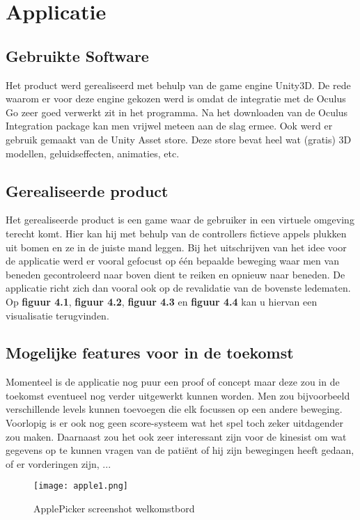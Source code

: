 \chapter{Applicatie}
\label{ch:applicatie}

\section{Gebruikte Software}
Het product werd gerealiseerd met behulp van de game engine Unity3D. De rede waarom er voor deze engine gekozen werd is omdat de integratie met de Oculus Go zeer goed verwerkt zit in het programma. Na het downloaden van de Oculus Integration package kan men vrijwel meteen aan de slag ermee. Ook werd er gebruik gemaakt van de Unity Asset store. Deze store bevat heel wat (gratis) 3D modellen, geluidseffecten, animaties, etc.

\section{Gerealiseerde product}
Het gerealiseerde product is een game waar de gebruiker in een virtuele omgeving terecht komt. Hier kan hij met behulp van de controllers fictieve appels plukken uit bomen en ze in de juiste mand leggen. Bij het uitschrijven van het idee voor de applicatie werd er vooral gefocust op één bepaalde beweging waar men van beneden gecontroleerd naar boven dient te reiken en opnieuw naar beneden. De applicatie richt zich dan vooral ook op de revalidatie van de bovenste ledematen. Op \textbf{figuur 4.1}, \textbf{figuur 4.2}, \textbf{figuur 4.3} en \textbf{figuur 4.4} kan u hiervan een visualisatie terugvinden.

\section{Mogelijke features voor in de toekomst}
Momenteel is de applicatie nog puur een proof of concept maar deze zou in de toekomst eventueel nog verder uitgewerkt kunnen worden. Men zou bijvoorbeeld verschillende levels kunnen toevoegen die elk focussen op een andere beweging. Voorlopig is er ook nog geen score-systeem wat het spel toch zeker uitdagender zou maken. Daarnaast zou het ook zeer interessant zijn voor de kinesist om wat gegevens op te kunnen vragen van de patiënt of hij zijn bewegingen heeft gedaan, of er vorderingen zijn, ...

\begin{figure}[h]
    \centering
    \texttt{[image: apple1.png]}
    \caption{ApplePicker screenshot welkomstbord}
\end{figure}

